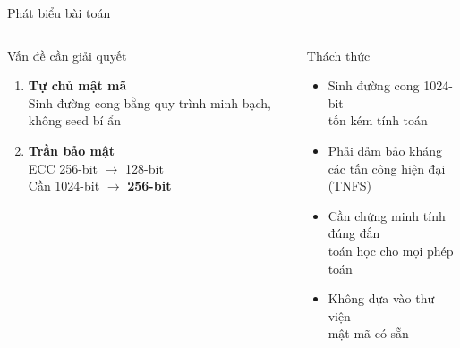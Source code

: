 \begin{frame}{Phát biểu bài toán}
  \begin{columns}[t]
      \begin{alertblock}{Vấn đề cần giải quyết}
        \begin{enumerate}
          \item \textbf{Tự chủ mật mã}\\
                Sinh đường cong bằng quy trình minh bạch, không seed bí ẩn
          \item \textbf{Trần bảo mật}\\
                ECC 256-bit $\to$ 128-bit\\
                Cần 1024-bit $\to$ \textbf{256-bit}
        \end{enumerate}
      \end{alertblock}
      \begin{block}{Thách thức}
        \begin{itemize}
          \item Sinh đường cong 1024-bit\\tốn kém tính toán
          \item Phải đảm bảo kháng\\các tấn công hiện đại (TNFS)
          \item Cần chứng minh tính đúng đắn\\toán học cho mọi phép toán
          \item Không dựa vào thư viện\\mật mã có sẵn
        \end{itemize}
      \end{block}
  \end{columns}
\end{frame}

